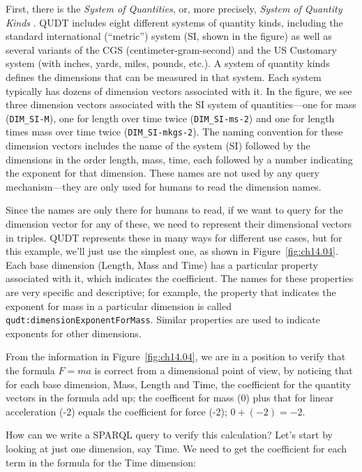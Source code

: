 First, there is the \emph{System of Quantities}, or, more precisely, \emph{System of Quantity Kinds} . QUDT includes eight different
systems of quantity kinds, including the standard international (``metric'')
system (SI, shown in the figure) as well as several variants of the CGS
(centimeter-gram-second) and the US Customary system (with inches,
yards, miles, pounds, etc.). A system of quantity kinds defines the
dimensions that can be measured in that system. Each system typically
has dozens of dimension vectors associated with it. In the figure, we see three
dimension vectors associated with the SI system of quantities---one for mass
(\texttt{DIM\_SI-M}), one for length over time twice (\texttt{DIM\_SI-ms-2})
and one for length times mass over time twice (\texttt{DIM\_SI-mkgs-2}).
The naming convention for these dimension vectors includes the name of the
system (SI) followed by the dimensions in the order length, mass, time,
each followed by a number indicating the exponent for that dimension.
These names are not used by any query mechanism---they are only used for
humans to read the dimension names.

Since the names are only there for humans to read, if we want to query
for the dimension vector for any of these, we need to represent their
dimensional vectors in triples.  QUDT represents these in many ways for 
different use cases, but for this example, we'll just use the simplest 
one, as shown in Figure~\ref{fig:ch14.04}.  Each base dimension (Length, Mass and Time) has a particular
property associated with it, which indicates the coefficient.  The names for 
these properties are very specific and descriptive; for example, the property that indicates
the exponent for mass in a particular dimension is called \texttt{qudt:dimensionExponentForMass}. Similar properties 
are used to indicate exponents for other dimensions. 

From the information in Figure~\ref{fig:ch14.04}, 
we are in
a position to verify  that the formula $F = ma$ 
is correct from a dimensional point of view, by noticing that for each base 
dimension, Mass, Length and Time, 
the coefficient for the quantity vectors in the formula add up; the coefficent for mass (0) plus that for linear acceleration (-2)
equals the coefficient for force (-2); $0 + (-2) = -2$.

How can we write a SPARQL query to verify this calculation?  Let's start by 
looking at just one dimension, say Time.  We need to get the coefficient for each
term in the formula for the Time dimension:

